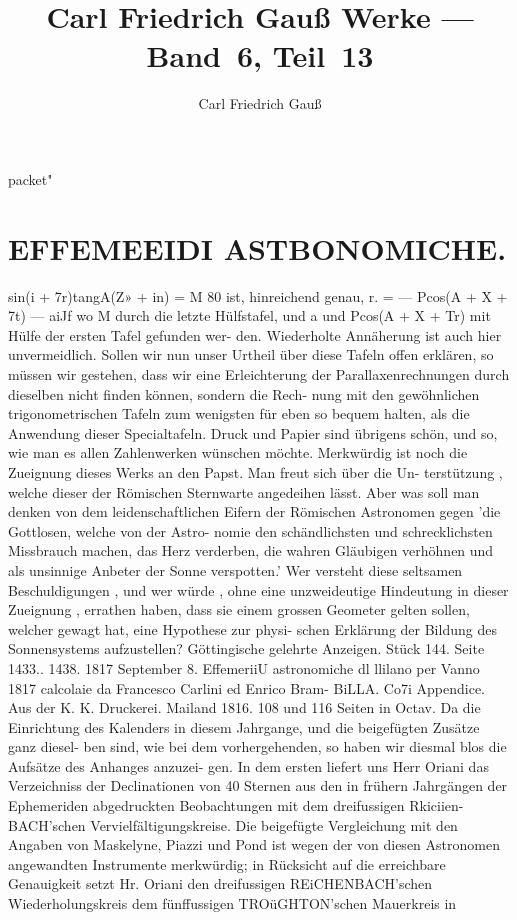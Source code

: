 \documentclass[12pt,a4paper]{article}
\title{Carl Friedrich Gau\ss{} Werke --- Band~6, Teil~13}
\author{Carl Friedrich Gau\ss{}}
\date{}
\begin{document}
\shortcontinuation packet{"}
\maketitle
\thispagestyle{fancy}


\section*{EFFEMEEIDI  ASTBONOMICHE.}

sin(i  +  7r)tangA(Z»  +  in)  =  M 80  ist,  hinreichend  genau, r.  =  ---  Pcos(A  +  X  +  7t)  --- aiJf wo  M  durch  die  letzte  Hülfstafel,  und  a  und  Pcos(A  +  X  +  Tr)  mit  Hülfe  der  ersten  Tafel  gefunden  wer- den.    Wiederholte  Annäherung  ist  auch  hier  unvermeidlich. Sollen  wir  nun  unser  Urtheil  über  diese  Tafeln  offen  erklären,  so  müssen  wir  gestehen,  dass  wir eine  Erleichterung  der  Parallaxenrechnungen  durch  dieselben  nicht  finden  können,  sondern  die  Rech- nung mit  den  gewöhnlichen  trigonometrischen  Tafeln  zum  wenigsten  für  eben  so  bequem  halten,  als  die Anwendung  dieser  Specialtafeln.  Druck  und  Papier  sind  übrigens  schön,  und  so,  wie  man  es  allen Zahlenwerken  wünschen  möchte. Merkwürdig  ist  noch  die  Zueignung  dieses  Werks  an  den  Papst.  Man  freut  sich  über  die  Un- terstützung ,  welche  dieser  der  Römischen  Sternwarte  angedeihen  lässt.  Aber  was  soll  man  denken  von dem  leidenschaftlichen  Eifern  der  Römischen  Astronomen  gegen  'die  Gottlosen,  welche  von  der  Astro- nomie den  schändlichsten  und  schrecklichsten  Missbrauch  machen,  das  Herz  verderben,  die  wahren Gläubigen  verhöhnen  und  als  unsinnige  Anbeter  der  Sonne  verspotten.'  Wer  versteht  diese  seltsamen Beschuldigungen ,  und  wer  würde ,  ohne  eine  unzweideutige  Hindeutung  in  dieser  Zueignung ,  errathen haben,  dass  sie  einem  grossen  Geometer  gelten  sollen,  welcher  gewagt  hat,  eine  Hypothese  zur  physi- schen Erklärung  der  Bildung  des  Sonnensystems  aufzustellen? Göttingische  gelehrte  Anzeigen.     Stück  144.     Seite  1433..  1438.     1817  September  8. EffemeriiU  astronomiche  dl  llilano  per  Vanno  1817  calcolaie  da  Francesco  Carlini  ed  Enrico  Bram- BiLLA.     Co7i  Appendice.     Aus  der  K.  K.  Druckerei.     Mailand  1816.     108  und  116  Seiten  in  Octav. Da  die  Einrichtung  des  Kalenders  in  diesem  Jahrgange,  und  die  beigefügten  Zusätze  ganz  diesel- ben sind,  wie  bei  dem  vorhergehenden,  so  haben  wir  diesmal  blos  die  Aufsätze  des  Anhanges  anzuzei- gen. In  dem  ersten  liefert  uns  Herr  Oriani  das  Verzeichniss  der  Declinationen  von  40  Sternen  aus  den in  frühern  Jahrgängen  der  Ephemeriden  abgedruckten  Beobachtungen  mit  dem  dreifussigen  Rkiciien- BACH'schen  Vervielfältigungskreise.  Die  beigefügte  Vergleichung  mit  den  Angaben  von  Maskelyne,  Piazzi und  Pond  ist  wegen  der  von  diesen  Astronomen  angewandten  Instrumente  merkwürdig;  in  Rücksicht auf  die  erreichbare  Genauigkeit  setzt  Hr.  Oriani  den  dreifussigen  REiCHENBACH'schen  Wiederholungskreis dem  fünffussigen  TROüGHTON'schen  Mauerkreis  in  
\end{document}

